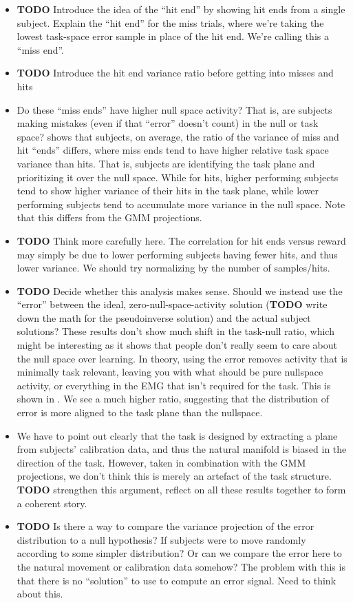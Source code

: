 \documentclass[../main.tex]{subfiles}
\begin{document}
\begin{itemize}
  \setlength\itemsep{0em}
  \item \textbf{TODO} Introduce the idea of the ``hit end'' by showing hit ends from a single subject. Explain the ``hit end'' for the miss trials, where we're taking the lowest task-space error sample in place of the hit end. We're calling this a ``miss end''.
  \item \textbf{TODO} Introduce the hit end variance ratio before getting into misses and hits
  \item Do these ``miss ends'' have higher null space activity? That is, are subjects making mistakes (even if that ``error'' doesn't count) in the null or task space?  shows that subjects, on average, the ratio of the variance of miss and hit ``ends'' differs, where miss ends tend to have higher relative task space variance than hits. That is, subjects are identifying the task plane and prioritizing it over the null space. While for hits, higher performing subjects tend to show higher variance of their hits in the task plane, while lower performing subjects tend to accumulate more variance in the null space. Note that this differs from the GMM projections.
  \item \textbf{TODO} Think more carefully here. The correlation for hit ends versus reward may simply be due to lower performing subjects having fewer hits, and thus lower variance. We should try normalizing by the number of samples/hits. 
  \item \textbf{TODO} Decide whether this analysis makes sense. Should we instead use the ``error'' between the ideal, zero-null-space-activity solution (\textbf{TODO} write down the math for the pseudoinverse solution) and the actual subject solutions? These results don't show much shift in the task-null ratio, which might be interesting as it shows that people don't really seem to care about the null space over learning. In theory, using the error removes activity that is minimally task relevant, leaving you with what should be pure nullspace activity, or everything in the EMG that isn't required for the task. This is shown in . We see a much higher ratio, suggesting that the distribution of error is more aligned to the task plane than the nullspace. 
  \item We have to point out clearly that the task is designed by extracting a plane from subjects' calibration data, and thus the natural manifold is biased in the direction of the task. However, taken in combination with the GMM projections, we don't think this is merely an artefact of the task structure. \textbf{TODO} strengthen this argument, reflect on all these results together to form a coherent story.
  \item \textbf{TODO} Is there a way to compare the variance projection of the error distribution to a null hypothesis? If subjects were to move randomly according to some simpler distribution? Or can we compare the error here to the natural movement or calibration data somehow? The problem with this is that there is no ``solution'' to use to compute an error signal. Need to think about this.
\end{itemize}
\end{document}
